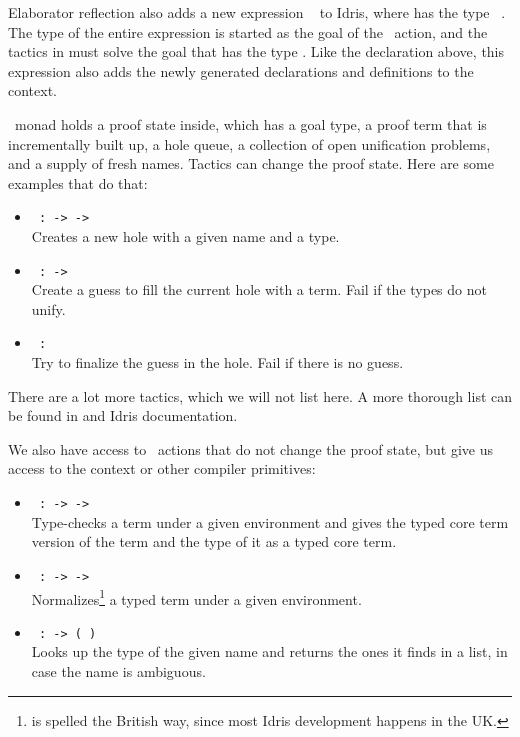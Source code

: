 Elaborator reflection also adds a new expression
\texttt{}\  to Idris,
where  has the type \ \ty{()}.
The type  of the entire expression is started as the goal of the
\Elab\ action, and the tactics in  must solve the goal
that has the type .
Like the declaration above, this expression also adds the newly generated
declarations and definitions to the context.

\Elab\ monad holds a proof state inside, which has a goal type, a proof term that is incrementally built up, a hole queue, a collection of open unification problems, and a supply of fresh names.\cite{elabref}
Tactics can change the proof state. Here are some examples that do that:
\begin{itemize}
\item\texttt{ :  ->  ->  \IdrisType{()}}\\
Creates a new hole with a given name and a type.
\item\texttt{ :  ->  \IdrisType{()}}\\
Create a guess to fill the current hole with a term. Fail if the types do not unify.
\item\texttt{ :  \IdrisType{()}}\\
Try to finalize the guess in the hole. Fail if there is no guess.
\end{itemize}

There are a lot more tactics, which we will not list here. A more thorough list
can be found in \cite{elabref} and Idris documentation.

We also have access to \Elab\ actions that do not change the proof state, but give us access to the context or other compiler primitives:
\begin{itemize}
\item\texttt{ :  \IdrisType{(}\IdrisType{,}  \IdrisType{)} ->  ->  \IdrisType{(}\IdrisType{,} \IdrisType{)}}\\
Type-checks a term under a given environment and gives the typed core term version of the  term and the type of it as a typed core term.
\item\texttt{ :  \IdrisType{(}\IdrisType{,}  \IdrisType{)} ->  ->  }\\
Normalizes\footnote{ is spelled the British way, since most Idris development happens in the UK.} a typed term under a given environment.
\item\texttt{ :  ->  ( \IdrisType{(}\IdrisType{,} \IdrisType{,} \IdrisType{)})}\\
Looks up the type of the given name and returns the ones it finds in a list, in case the name is ambiguous.
\end{itemize}

